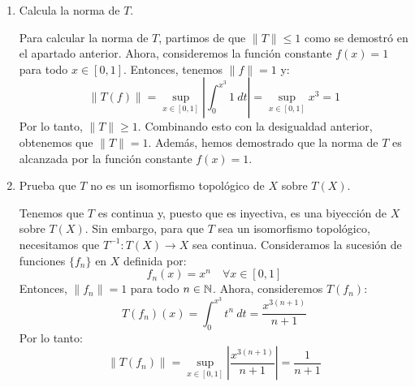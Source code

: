 \documentclass[12pt]{article}
\begin{document}
\begin{ejercicio}[4 puntos]
\begin{enumerate}[label=\alph*)]
            Para $x \in \left]0,1\right]$, tenemos $3x^2 \neq 0$, por lo que $f(x^3) = 0$. Como $x^3$ recorre el intervalo $[0,1]$ cuando $x$ recorre $[0,1]$, concluimos que:
            \begin{equation*}
                f(z) = 0 \quad \forall z \in \left]0,1\right]
            \end{equation*}
            Además, como $f$ es continua en $[0,1]$, tenemos que
            \begin{equation*}
                f(0) = \lim_{z \to 0^+} f(z) = 0
            \end{equation*}
            Por lo tanto, $f \equiv 0$, lo que demuestra que $T$ es inyectiva.
            \item Calcula la norma de $T$.
            
            Para calcular la norma de $T$, partimos de que $\|T\|\leq 1$ como se demostró en el apartado anterior. Ahora, consideremos la función constante $f(x) = 1$ para todo $x \in [0,1]$. Entonces, tenemos $\|f\| = 1$ y:
            \begin{equation*}
                \|T(f)\| = \sup_{x\in [0,1]} \left|\int_{0}^{x^3} 1~dt\right| = \sup_{x\in [0,1]} x^3 = 1
            \end{equation*}
            Por lo tanto, $\|T\| \geq 1$. Combinando esto con la desigualdad anterior, obtenemos que $\|T\| = 1$. Además, hemos demostrado que la norma de $T$ es alcanzada por la función constante $f(x) = 1$.
            \item Prueba que $T$ no es un isomorfismo topológico de $X$ sobre $T(X)$.
            
            Tenemos que $T$ es continua y, puesto que es inyectiva, es una biyección de $X$ sobre $T(X)$. Sin embargo, para que $T$ sea un isomorfismo topológico, necesitamos que $T^{-1}:T(X)\to X$ sea continua. Consideramos la sucesión de funciones $\{f_n\}$ en $X$ definida por:
            \begin{equation*}
                f_n(x) = x^n \quad \forall x \in [0,1]
            \end{equation*}
            Entonces, $\|f_n\| = 1$ para todo $n\in \mathbb{N}$. Ahora, consideremos $T(f_n)$:
            \begin{equation*}
                T(f_n)(x) = \int_{0}^{x^3} t^n~dt = \frac{x^{3(n+1)}}{n+1}
            \end{equation*}
            Por lo tanto:
            \begin{equation*}
                \|T(f_n)\| = \sup_{x\in [0,1]} \left|\frac{x^{3(n+1)}}{n+1}\right| = \frac{1}{n+1}
            \end{equation*}


\end{enumerate}
\end{ejercicio}
\end{document}
